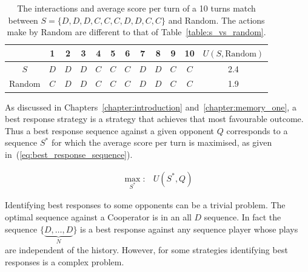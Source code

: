 \begin{table}[htb]
\centering
\begin{tabular}{cccccccccccc}
    & \textbf{1} & \textbf{2} & \textbf{3} & \textbf{4}  & \textbf{5} & \textbf{6} & \textbf{7} & \textbf{8}  & \textbf{9} & \textbf{10} & \(U(S, \text{Random})\) \\ 
    \midrule 
    \(S\) & \(D\) & \(D\) & \(D\) & \(C\) & \(C\) & \(C\) & \(D\) & \(D\) & \(C\) & \(C\) & 2.4 \\
    Random & \(C\) & \(D\) & \(D\) & \(C\) & \(C\) & \(C\) & \(D\) & \(D\) & \(C\) & \(C\) & 1.9 \\ \bottomrule
\end{tabular}
\caption{The interactions and average score per turn of a 10 turns match between
\(S = \{D, D, D, C, C, C, D, D, C, C\}\) and Random. The actions make by Random
are different to that of Table~\ref{table:s_vs_random}.}\label{table:s_vs_random_2}
\end{table}

As discussed in Chapters~\ref{chapter:introduction} and~\ref{chapter:memory_one},
a best response strategy is a strategy that achieves that most favourable outcome.
Thus a best response sequence against a given opponent \(Q\) corresponds
to a sequence \(S^*\) for which the average score per turn is maximised,
as given in~(\ref{eq:best_response_sequence}).

\begin{equation}\label{eq:best_response_sequence}
    \begin{aligned}
    \max_{S^*}: & U(S^*, Q)
    \end{aligned}
\end{equation}

Identifying best responses to some opponents can be a trivial problem. The
optimal sequence against a Cooperator is in an all \(D\) sequence. In fact the
sequence \(\{\underbrace{D, \dots, D}_{N}\}\) is a best response
against any sequence player whose plays are independent of the history.
However,
for some strategies identifying best responses is a complex problem.

